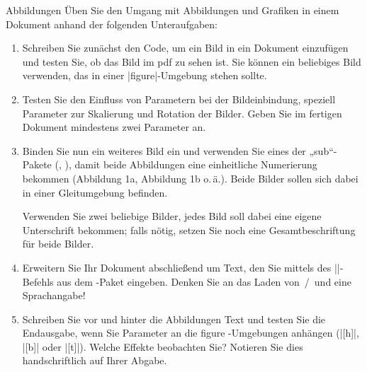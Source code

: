 \documentclass[
	vorläufig=true, 
	blattnr=5,
	ausgabe=2016-11-25,
	abgabe=2016-12-02,
	lösung,
	shortverb,
]{../tex/latexkurs-exercise}
\begin{document}
\begin{aufgabe}[6]{Abbildungen}
Üben Sie den Umgang mit Abbildungen und Grafiken in einem Dokument anhand der folgenden Unteraufgaben:
	\begin{enumerate}[label=\alph*)]
		\item Schreiben Sie zunächst den Code, um ein Bild in ein Dokument einzufügen und testen Sie,
ob das Bild im pdf zu sehen ist. Sie können ein beliebiges Bild verwenden, das in einer |figure|-Umgebung stehen sollte.
		\item Testen Sie den Einﬂuss von Parametern bei der Bildeinbindung, speziell Parameter zur
Skalierung und Rotation der Bilder. Geben Sie im fertigen Dokument mindestens zwei
Parameter an.
		\item Binden Sie nun ein weiteres Bild ein und verwenden Sie eines der „sub“-Pakete (, ), damit beide Abbildungen eine einheitliche Numerierung bekommen (Abbildung 1a, Abbildung 1b o.\,ä.). Beide Bilder sollen sich dabei in einer Gleitumgebung beﬁnden.
	
		Verwenden Sie zwei beliebige Bilder, jedes Bild soll dabei eine eigene Unterschrift bekommen; falls nötig, setzen Sie noch eine Gesamtbeschriftung für beide Bilder.
		\item Erweitern Sie Ihr Dokument abschließend um Text, den Sie mittels des |\blindtext|-Befehls aus dem -Paket eingeben. Denken Sie an das Laden von \,/\, und eine Sprachangabe!
		\item Schreiben Sie vor und hinter die Abbildungen Text und testen Sie die Endausgabe, wenn Sie Parameter an die figure -Umgebungen anhängen (|[h]|, |[b]| oder |[t]|). Welche Effekte beobachten Sie? Notieren Sie dies handschriftlich auf Ihrer Abgabe.
	\end{enumerate}
\end{aufgabe}

\end{document}
